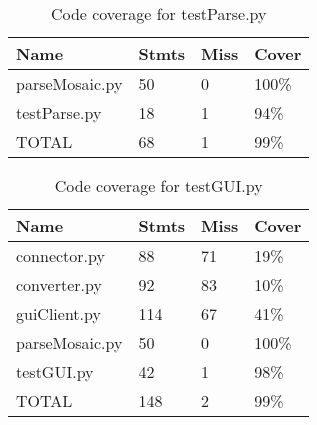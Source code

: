 \documentclass[12pt, titlepage]{article}
\begin{document}
		\begin{table}[!htbp]
			\begin{tabularx}{\textwidth}{|l|l|l|X|}
				\hline
				\textbf{Name} & \textbf{Stmts} & \textbf{Miss} & \textbf{Cover}
				\\ 
				\hline
			    parseMosaic.py  & 50 & 0 & 100\% \\ 
			    testParse.py & 18 & 1 & 94\% \\ 
				\hline
				\hline
			    TOTAL & 68 & 1 & 99\% \\ 
				\hline
			\end{tabularx}
			\caption{Code coverage for testParse.py }
			\label{Table}
		\end{table}		
		
		\begin{table}[!htbp]
			\begin{tabularx}{\textwidth}{|l|l|l|X|}
				\hline
				\textbf{Name} & \textbf{Stmts} & \textbf{Miss} & \textbf{Cover}
				\\ 
				\hline
                connector.py & 88 & 71 & 19\% \\
                converter.py & 92 & 83 & 10\% \\
                guiClient.py & 114 & 67 & 41\% \\
                parseMosaic.py & 50 & 0 & 100\% \\
                testGUI.py & 42 & 1 & 98\% \\
				\hline
				\hline
			    TOTAL & 148 & 2 & 99\% \\ 
				\hline
			\end{tabularx}
			\caption{Code coverage for testGUI.py}
			\label{Table}
		\end{table}		
		
\FloatBarrier	



\end{document}
